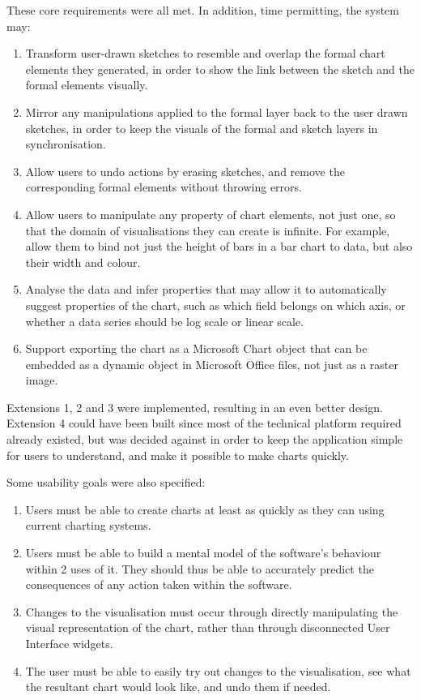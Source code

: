 	These core requirements were all met.
	In addition, time permitting, the system may:
	\begin{enumerate}[label=\bfseries Extension \arabic*]
		\item Transform user-drawn sketches to resemble and overlap the formal chart elements they generated, in order to show the link between the sketch and the formal elements visually.
		\item Mirror any manipulations applied to the formal layer back to the user drawn sketches, in order to keep the visuals of the formal and sketch layers in synchronisation.
		\item Allow users to undo actions by erasing sketches, and remove the corresponding formal elements without throwing errors.
		\item Allow users to manipulate any property of chart elements, not just one, so that the domain of visualisations they can create is infinite. For example, allow them to bind not just the height of bars in a bar chart to data, but also their width and colour. 
		\item Analyse the data and infer properties that may allow it to automatically suggest properties of the chart, such as which field belongs on which axis, or whether a data series should be log scale or linear scale.
		\item Support exporting the chart as a Microsoft Chart object that can be embedded as a dynamic object in Microsoft Office files, not just as a raster image.
	\end{enumerate}
	
	Extensions 1, 2 and 3 were implemented, resulting in an even better design. Extension 4 could have been built since most of the technical platform required already existed, but was decided against in order to keep the application simple for users to understand, and make it possible to make charts quickly.	
	
	Some usability goals were also specified:
	\begin{enumerate}[label=\bfseries Usability \arabic*]
		\item Users must be able to create charts at least as quickly as they can using current charting systems.
		\item Users must be able to build a mental model of the software's behaviour within 2 uses of it. They should thus be able to accurately predict the consequences of any action taken within the software.
		\item Changes to the visualisation must occur through directly manipulating the visual representation of the chart, rather than through disconnected User Interface widgets.
		\item The user must be able to easily try out changes to the visualisation, see what the resultant chart would look like, and undo them if needed.
	\end{enumerate}
	
